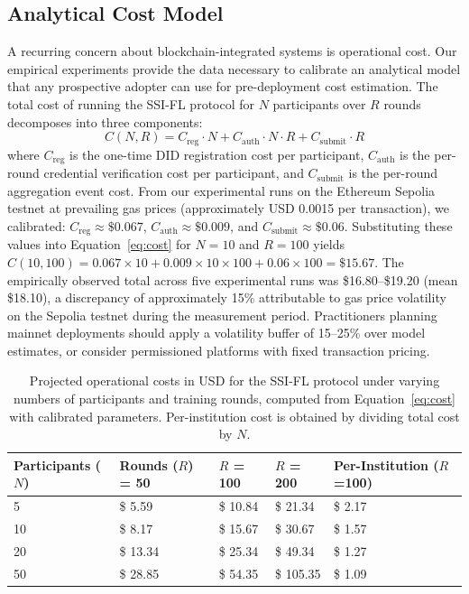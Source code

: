\documentclass{sbc2023}
\begin{document}
\subsection{Analytical Cost Model}

A recurring concern about blockchain-integrated systems is operational cost. Our empirical experiments provide the data necessary to calibrate an analytical model that any prospective adopter can use for pre-deployment cost estimation. The total cost of running the SSI-FL protocol for $N$ participants over $R$ rounds decomposes into three components:
\begin{equation}
C(N, R) = C_{\text{reg}} \cdot N + C_{\text{auth}} \cdot N \cdot R + C_{\text{submit}} \cdot R
\label{eq:cost}
\end{equation}
where $C_{\text{reg}}$ is the one-time DID registration cost per participant, $C_{\text{auth}}$ is the per-round credential verification cost per participant, and $C_{\text{submit}}$ is the per-round aggregation event cost. From our experimental runs on the Ethereum Sepolia testnet at prevailing gas prices (approximately USD 0.0015 per transaction), we calibrated: $C_{\text{reg}} \approx \$ 0.067$, $C_{\text{auth}} \approx \$ 0.009$, and $C_{\text{submit}} \approx \$ 0.06$. Substituting these values into Equation~\ref{eq:cost} for $N = 10$ and $R = 100$ yields $C(10, 100) = 0.067 \times 10 + 0.009 \times 10 \times 100 + 0.06 \times 100 = \$ 15.67$. The empirically observed total across five experimental runs was \$16.80--\$19.20 (mean \$18.10), a discrepancy of approximately 15\% attributable to gas price volatility on the Sepolia testnet during the measurement period. Practitioners planning mainnet deployments should apply a volatility buffer of 15--25\% over model estimates, or consider permissioned platforms with fixed transaction pricing.

\begin{table}[!ht]
\caption{Projected operational costs in USD for the SSI-FL protocol under varying numbers of participants and training rounds, computed from Equation~\ref{eq:cost} with calibrated parameters. Per-institution cost is obtained by dividing total cost by $N$.}
\label{tab:cost}
\centering
\begin{tabularx}{\textwidth}{lXXXX}
\toprule
\textbf{Participants ($N$)} & \textbf{Rounds ($R$) = 50} & \textbf{$R$ = 100} & \textbf{$R$ = 200} & \textbf{Per-Institution ($R$=100)} \\
\midrule
5 & \$ 5.59 & \$ 10.84 & \$ 21.34 & \$ 2.17 \\
10 & \$ 8.17 & \$ 15.67 & \$ 30.67 & \$ 1.57 \\
20 & \$ 13.34 & \$ 25.34 & \$ 49.34 & \$ 1.27 \\
50 & \$ 28.85 & \$ 54.35 & \$ 105.35 & \$ 1.09 \\
\bottomrule
\end{tabularx}
\end{table}
\end{document}
